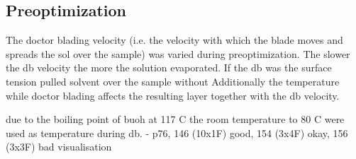 \subsection{Preoptimization}
The doctor blading velocity (i.e. the velocity with which the blade moves and spreads the sol over the sample) 
was varied during preoptimization. 
The slower the \gls{db} velocity the more  the solution evaporated. 
If the \gls{db} was  the surface tension pulled solvent over the sample without 
Additionally the temperature while doctor blading affects the resulting layer together with the \gls{db} velocity. 

due to the boiling point of \gls{buoh} at 117 C\cite{ncbi1butanol} the room temperature to 80 C were used as temperature during \gls{db}.
- p76, 146 (10x1F) good, 154 (3x4F) okay, 156 (3x3F) bad visualisation

